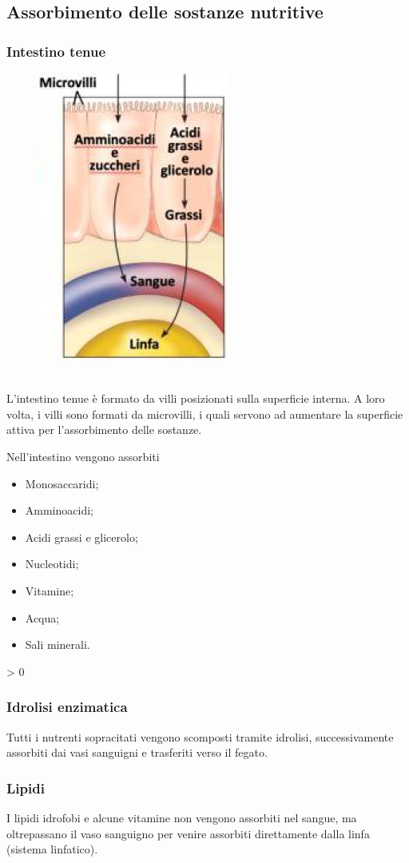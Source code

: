 \documentclass{article}
\makeatletter
\newcommand{\wrapfill}{
    \par
    \ifnum \value{WF@wrappedlines} > 0
        \addtocounter{WF@wrappedlines}{-1}%
        \null\vspace{
            \arabic{WF@wrappedlines}
            \baselineskip
        }
        \WFclear
    \fi
    \phantom{}
}
\makeatother
\begin{document}
\newpage
\subsection{Assorbimento delle sostanze nutritive}
\subsubsection{Intestino tenue}
\setlength{\intextsep}{0pt}%
\begin{figure}
    \includegraphics[width=.25\textwidth]{media/intestino.png}
    \vspace{-2.4cm}
\end{figure}
\phantom{}\\
L'intestino tenue è formato da villi posizionati sulla superficie interna. A loro volta, i
villi sono formati da microvilli, i quali servono ad aumentare la superficie attiva per
l'assorbimento delle sostanze.

Nell'intestino vengono assorbiti
\begin{itemize}
    \item Monosaccaridi;
    \item Amminoacidi;
    \item Acidi grassi e glicerolo;
    \item Nucleotidi;
    \item Vitamine;
    \item Acqua;
    \item Sali minerali.
\end{itemize}
\wrapfill

\subsubsection{Idrolisi enzimatica}
Tutti i nutrenti sopracitati vengono scomposti tramite idrolisi, successivamente assorbiti
dai vasi sanguigni e trasferiti verso il fegato.

\subsubsection{Lipidi}
I lipidi idrofobi e alcune vitamine non vengono assorbiti nel sangue, ma oltrepassano il vaso
sanguigno per venire assorbiti direttamente dalla linfa (sistema linfatico).
\end{document}
